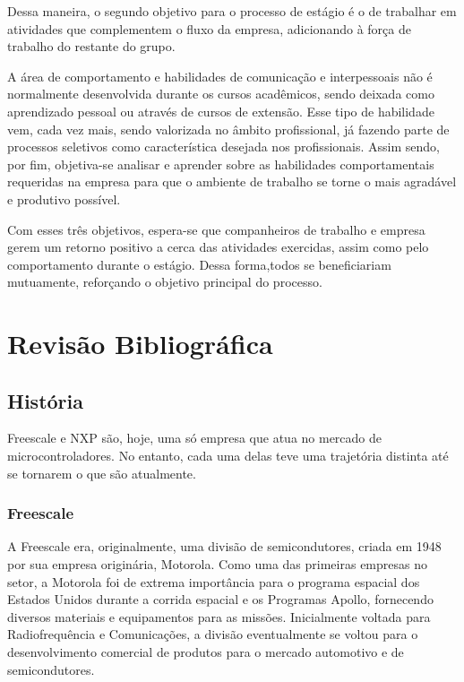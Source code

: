 \documentclass[
	12pt,				%
    oneside,			%
	a4paper,			%
	english,			%
	french,				%
	spanish,			%
	brazil				%
	]{abntex2}
\begin{document}
Dessa maneira, o segundo objetivo para o processo de estágio é o de trabalhar em atividades que complementem o fluxo da empresa, adicionando à força de trabalho do restante do grupo.

A área de comportamento e habilidades de comunicação e interpessoais não é normalmente desenvolvida durante os cursos acadêmicos, sendo deixada como aprendizado pessoal ou através de cursos de extensão. Esse tipo de habilidade vem, cada vez mais, sendo valorizada no âmbito profissional, já fazendo parte de processos seletivos como característica desejada nos profissionais. Assim sendo, por fim, objetiva-se analisar e aprender sobre as habilidades comportamentais requeridas na empresa para que o ambiente de trabalho se torne o mais agradável e produtivo possível. 

Com esses três objetivos, espera-se que companheiros de trabalho e empresa gerem um retorno positivo a cerca das atividades exercidas, assim como pelo comportamento durante o estágio. Dessa forma,todos se beneficiariam mutuamente, reforçando o objetivo principal do processo.

\chapter{Revisão Bibliográfica}

\section{História}

Freescale e NXP são, hoje, uma só empresa que atua no mercado de microcontroladores. No entanto, cada uma delas teve uma trajetória distinta até se tornarem o que são atualmente.

\subsection{Freescale}

A Freescale era, originalmente, uma divisão de semicondutores, criada em 1948 por sua empresa originária, Motorola. Como uma das primeiras empresas no setor, a Motorola foi de extrema importância para o programa espacial dos Estados Unidos durante a corrida espacial e os Programas Apollo, fornecendo diversos materiais e equipamentos para as missões. Inicialmente voltada para Radiofrequência e Comunicações, a divisão eventualmente se voltou para o desenvolvimento comercial de produtos para o mercado automotivo e de semicondutores.
\end{document}
